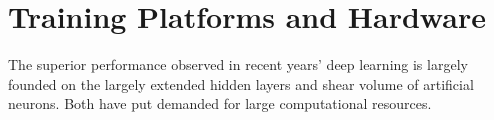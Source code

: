 \section{Training Platforms and Hardware}
The superior performance observed in recent years' deep learning is largely founded on the largely extended hidden layers and shear volume of artificial neurons. Both have put demanded for large computational resources. 